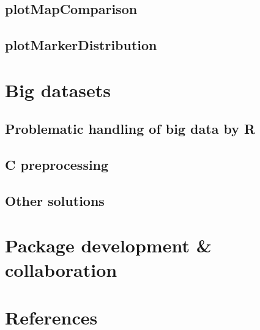 \documentclass{article}
\begin{document}
\subsection{plotMapComparison}
\blindtext[2]
\subsection{plotMarkerDistribution}
\blindtext[2]
\newpage
\section{Big datasets}
\begin{multicols}{2}
\subsection{Problematic handling of big data by R}
\blindtext
\subsection{C preprocessing}
\blindtext
\subsection{Other solutions}
\blindtext
\end{multicols}
\newpage
\section{Package development \& collaboration}
\newpage
\section{References}
\end{document}

